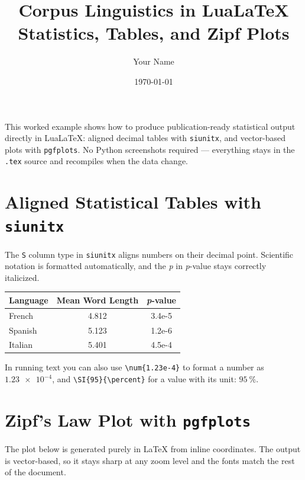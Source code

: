 \documentclass[11pt,a4paper]{article}
\title{Corpus Linguistics in LuaLaTeX \\ \large Statistics, Tables, and Zipf Plots}
\author{Your Name}
\date{\today}
\begin{document}
\maketitle

This worked example shows how to produce publication-ready statistical
output directly in LuaLaTeX: aligned decimal tables with \texttt{siunitx},
and vector-based plots with \texttt{pgfplots}. No Python screenshots required
--- everything stays in the \texttt{.tex} source and recompiles when the data
change.

\section{Aligned Statistical Tables with \texttt{siunitx}}

The \texttt{S} column type in \texttt{siunitx} aligns numbers on their decimal
point. Scientific notation is formatted automatically, and the \textit{p} in
\textit{p}-value stays correctly italicized.

\begin{center}
\begin{tabular}{l S[table-format=2.3] S[table-format=1.3e-1]}
\toprule
\textbf{Language} & \textbf{Mean Word Length} & \textbf{\textit{p}-value} \\
\midrule
French  & 4.812 & 3.4e-5 \\
Spanish & 5.123 & 1.2e-6 \\
Italian & 5.401 & 4.5e-4 \\
\bottomrule
\end{tabular}
\end{center}

In running text you can also use \verb|\num{1.23e-4}| to format a number as
$\num{1.23e-4}$, and \verb|\SI{95}{\percent}| for a value with its unit:
$\SI{95}{\percent}$.

\section{Zipf's Law Plot with \texttt{pgfplots}}

The plot below is generated purely in LaTeX from inline coordinates. The
output is vector-based, so it stays sharp at any zoom level and the fonts
match the rest of the document.

\begin{center}
\end{center}
\end{document}
